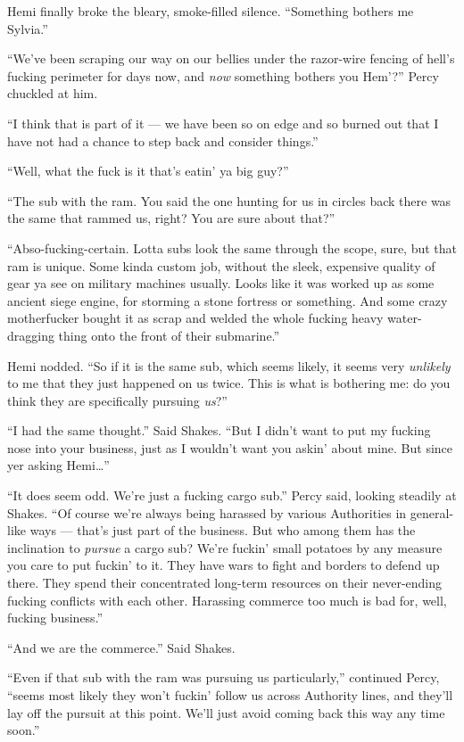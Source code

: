 \documentclass[]{scrbook}
\begin{document}
Hemi finally broke the bleary, smoke-filled silence. ``Something bothers
me Sylvia.''

``We've been scraping our way on our bellies under the razor-wire
fencing of hell's fucking perimeter for days now, and \emph{now}
something bothers you Hem'?'' Percy chuckled at him.

``I think that is part of it --- we have been so on edge and so burned
out that I have not had a chance to step back and consider things.''

``Well, what the fuck is it that's eatin' ya big guy?''

``The sub with the ram. You said the one hunting for us in circles back
there was the same that rammed us, right? You are sure about that?''

``Abso-fucking-certain. Lotta subs look the same through the scope,
sure, but that ram is unique. Some kinda custom job, without the sleek,
expensive quality of gear ya see on military machines usually. Looks
like it was worked up as some ancient siege engine, for storming a stone
fortress or something. And some crazy motherfucker bought it as scrap
and welded the whole fucking heavy water-dragging thing onto the front
of their submarine.''

Hemi nodded. ``So if it is the same sub, which seems likely, it seems
very \emph{unlikely} to me that they just happened on us twice. This is
what is bothering me: do you think they are specifically pursuing
\emph{us}?''

``I had the same thought.'' Said Shakes. ``But I didn't want to put my
fucking nose into your business, just as I wouldn't want you askin'
about mine. But since yer asking Hemi\ldots{}''

``It does seem odd. We're just a fucking cargo sub.'' Percy said,
looking steadily at Shakes. ``Of course we're always being harassed by
various Authorities in general-like ways --- that's just part of the
business. But who among them has the inclination to \emph{pursue} a
cargo sub? We're fuckin' small potatoes by any measure you care to put
fuckin' to it. They have wars to fight and borders to defend up there.
They spend their concentrated long-term resources on their never-ending
fucking conflicts with each other. Harassing commerce too much is bad
for, well, fucking business.''

``And we are the commerce.'' Said Shakes.

``Even if that sub with the ram was pursuing us particularly,''
continued Percy, ``seems most likely they won't fuckin' follow us across
Authority lines, and they'll lay off the pursuit at this point. We'll
just avoid coming back this way any time soon.''
\end{document}
